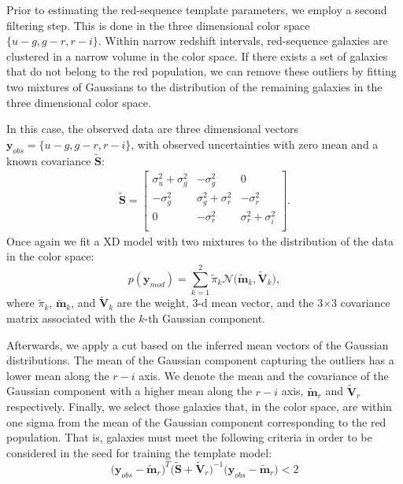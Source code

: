 \documentclass[fleqn,usenatbib]{mnras}
\newcommand{\be}{\begin{equation}}
\newcommand{\ee}{\end{equation}}
\begin{document}
Prior to estimating the red-sequence template parameters, we employ a second filtering step. This is done in the three dimensional color space $\{u-g,g-r,r-i\}$. 
Within narrow redshift intervals, red-sequence galaxies are clustered in a narrow volume in the color space. If there exists a set of galaxies that do not belong to the red population, we can remove these outliers by fitting two mixtures of Gaussians to the distribution of the remaining galaxies in the three dimensional color space. 

In this case, the observed data are three dimensional vectors $\mathbf{y}_{obs} = \{u-g,g-r,r-i\}$, with observed uncertainties with zero mean and a known covariance $\tilde{\mathbf{S}}$:
\begin{eqnarray}
\tilde{\mathbf{S}} = 
\begin{bmatrix}
        \sigma_{u}^2 + \sigma_{g}^2      &    -\sigma_{g}^2    &         0   \\
 -\sigma_{g}^2       &         \sigma_{g}^2  +   \sigma_{r}^2 & -\sigma_{r}^2  \\
 0 & -\sigma_{r}^2 & \sigma_{r}^2  +   \sigma_{i}^2 \\
 \end{bmatrix}.
 \label{eq:Sugri}
\end{eqnarray} 
Once again we fit a XD model with two mixtures to the distribution of the data in the color space:
\be
p(\mathbf{y}_{mod}) = \sum_{k=1}^{2} \tilde{\pi}_{k} \mathcal{N} \big(\tilde{\mathbf{m}}_{k}, \tilde{\mathbf{V}}_k \big),
\ee
where $\tilde{\pi}_k$, $\tilde{\mathbf{m}}_k$, and $\tilde{\mathbf{V}}_k$ are the weight, 3-d mean vector, and the 3$\times$3 covariance matrix associated with the $k$-th Gaussian component. 

Afterwards, we apply a cut based on the inferred mean vectors of the Gaussian distributions. The mean of the Gaussian component capturing the outliers has a lower mean along the $r-i$ axis. We denote the mean and the covariance of the Gaussian component with a higher mean along the $r-i$ axis, $\tilde{\mathbf{m}}_{r}$ and $\tilde{\mathbf{V}}_{r}$ respectively. Finally, we select those galaxies that, in the color space, are within one sigma from the mean of the Gaussian component corresponding to the red population. That is, galaxies must meet the following criteria in order to be considered in the seed for training the template model:
\be 
\big(\mathbf{y}_{obs} - \tilde{\mathbf{m}}_{r} \big)^{T}\big(\tilde{\mathbf{S}}+\tilde{\mathbf{V}}_r\big)^{-1}\big(\mathbf{y}_{obs} - \tilde{\mathbf{m}}_{r}\big) < 2
\label{eq:chithree}
\ee
\end{document}
